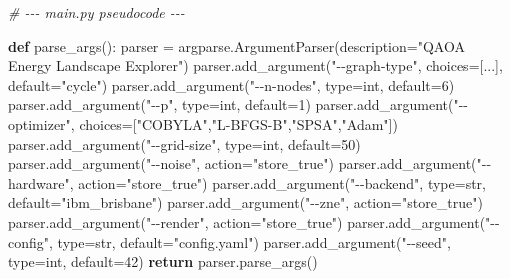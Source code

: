 \documentclass[
  11pt,
]{report}
\newenvironment{Shaded}{}{}
\newcommand{\BuiltInTok}[1]{\textcolor[rgb]{0.00,0.50,0.00}{#1}}
\newcommand{\CommentTok}[1]{\textcolor[rgb]{0.38,0.63,0.69}{\textit{#1}}}
\newcommand{\ControlFlowTok}[1]{\textcolor[rgb]{0.00,0.44,0.13}{\textbf{#1}}}
\newcommand{\DecValTok}[1]{\textcolor[rgb]{0.25,0.63,0.44}{#1}}
\newcommand{\KeywordTok}[1]{\textcolor[rgb]{0.00,0.44,0.13}{\textbf{#1}}}
\newcommand{\NormalTok}[1]{#1}
\newcommand{\OperatorTok}[1]{\textcolor[rgb]{0.40,0.40,0.40}{#1}}
\newcommand{\StringTok}[1]{\textcolor[rgb]{0.25,0.44,0.63}{#1}}
\begin{document}
\begin{Shaded}
\begin{Highlighting}[]
\CommentTok{\# {-}{-}{-} main.py pseudocode {-}{-}{-}}

\KeywordTok{def}\NormalTok{ parse\_args():}
\NormalTok{    parser }\OperatorTok{=}\NormalTok{ argparse.ArgumentParser(description}\OperatorTok{=}\StringTok{"QAOA Energy Landscape Explorer"}\NormalTok{)}
\NormalTok{    parser.add\_argument(}\StringTok{"{-}{-}graph{-}type"}\NormalTok{, choices}\OperatorTok{=}\NormalTok{[...], default}\OperatorTok{=}\StringTok{"cycle"}\NormalTok{)}
\NormalTok{    parser.add\_argument(}\StringTok{"{-}{-}n{-}nodes"}\NormalTok{, }\BuiltInTok{type}\OperatorTok{=}\BuiltInTok{int}\NormalTok{, default}\OperatorTok{=}\DecValTok{6}\NormalTok{)}
\NormalTok{    parser.add\_argument(}\StringTok{"{-}{-}p"}\NormalTok{, }\BuiltInTok{type}\OperatorTok{=}\BuiltInTok{int}\NormalTok{, default}\OperatorTok{=}\DecValTok{1}\NormalTok{)}
\NormalTok{    parser.add\_argument(}\StringTok{"{-}{-}optimizer"}\NormalTok{, choices}\OperatorTok{=}\NormalTok{[}\StringTok{"COBYLA"}\NormalTok{,}\StringTok{"L{-}BFGS{-}B"}\NormalTok{,}\StringTok{"SPSA"}\NormalTok{,}\StringTok{"Adam"}\NormalTok{])}
\NormalTok{    parser.add\_argument(}\StringTok{"{-}{-}grid{-}size"}\NormalTok{, }\BuiltInTok{type}\OperatorTok{=}\BuiltInTok{int}\NormalTok{, default}\OperatorTok{=}\DecValTok{50}\NormalTok{)}
\NormalTok{    parser.add\_argument(}\StringTok{"{-}{-}noise"}\NormalTok{, action}\OperatorTok{=}\StringTok{"store\_true"}\NormalTok{)}
\NormalTok{    parser.add\_argument(}\StringTok{"{-}{-}hardware"}\NormalTok{, action}\OperatorTok{=}\StringTok{"store\_true"}\NormalTok{)}
\NormalTok{    parser.add\_argument(}\StringTok{"{-}{-}backend"}\NormalTok{, }\BuiltInTok{type}\OperatorTok{=}\BuiltInTok{str}\NormalTok{, default}\OperatorTok{=}\StringTok{"ibm\_brisbane"}\NormalTok{)}
\NormalTok{    parser.add\_argument(}\StringTok{"{-}{-}zne"}\NormalTok{, action}\OperatorTok{=}\StringTok{"store\_true"}\NormalTok{)}
\NormalTok{    parser.add\_argument(}\StringTok{"{-}{-}render"}\NormalTok{, action}\OperatorTok{=}\StringTok{"store\_true"}\NormalTok{)}
\NormalTok{    parser.add\_argument(}\StringTok{"{-}{-}config"}\NormalTok{, }\BuiltInTok{type}\OperatorTok{=}\BuiltInTok{str}\NormalTok{, default}\OperatorTok{=}\StringTok{"config.yaml"}\NormalTok{)}
\NormalTok{    parser.add\_argument(}\StringTok{"{-}{-}seed"}\NormalTok{, }\BuiltInTok{type}\OperatorTok{=}\BuiltInTok{int}\NormalTok{, default}\OperatorTok{=}\DecValTok{42}\NormalTok{)}
    \ControlFlowTok{return}\NormalTok{ parser.parse\_args()}



\end{Highlighting}
\end{Shaded}
\end{document}

